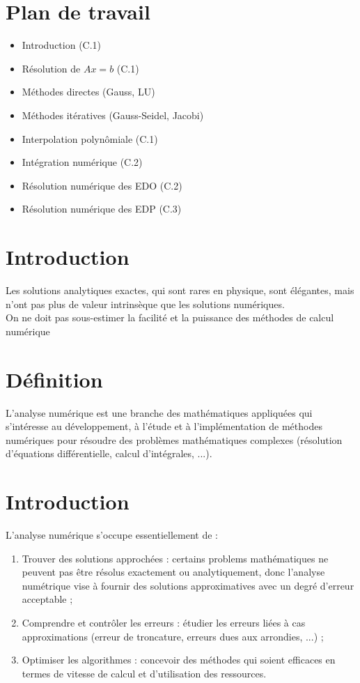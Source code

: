 \documentclass[10pt]{article}
\begin{document}
\section*{Plan de travail}
\begin{itemize}
  \item Introduction (C.1)
  \item Résolution de \(A x=b\) (C.1)
  \item Méthodes directes (Gauss, LU)
  \item Méthodes itératives (Gauss-Seidel, Jacobi)
  \item Interpolation polynômiale (C.1)
  \item Intégration numérique (C.2)
  \item Résolution numérique des EDO (C.2)
  \item Résolution numérique des EDP (C.3)
\end{itemize}

\section*{Introduction}
\og  Les solutions analytiques exactes, qui sont rares en physique, sont élégantes, mais n'ont pas plus de valeur intrinsèque que les solutions numériques.\\
On ne doit pas sous-estimer la facilité et la puissance des méthodes de calcul numérique \fg{} 



\section*{Définition}
L'analyse numérique est une branche des mathématiques appliquées qui s'intéresse au développement, à l'étude et à l'implémentation de méthodes numériques pour résoudre des problèmes mathématiques complexes (résolution d'équations différentielle, calcul d'intégrales, ...).

\section*{Introduction}
L'analyse numérique s'occupe essentiellement de :

\begin{enumerate}
  \item Trouver des solutions approchées : certains problems mathématiques ne peuvent pas être résolus exactement ou analytiquement, donc l'analyse numétrique vise à fournir des solutions approximatives avec un degré d'erreur acceptable ;
  \item Comprendre et contrôler les erreurs : étudier les erreurs liées à cas approximations (erreur de troncature, erreurs dues aux arrondies, ...) ;
  \item Optimiser les algorithmes : concevoir des méthodes qui soient efficaces en termes de vitesse de calcul et d'utilisation des ressources.
\end{enumerate}
\end{document}
